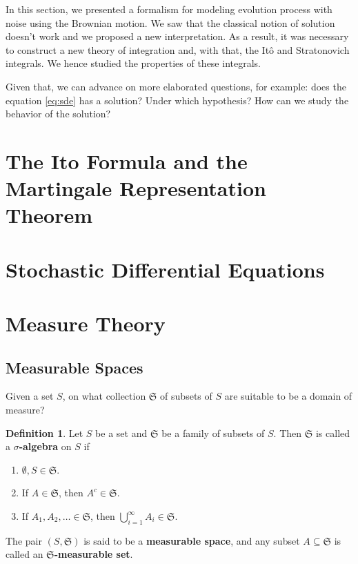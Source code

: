 \documentclass[12pt,a4paper]{article}
\theoremstyle{definition}
\newtheorem{definition}{Definition}[section]
\begin{document}
In this section, we presented a formalism for modeling evolution process with noise using the Brownian motion. We saw that the classical notion of solution doesn't work and we proposed a new interpretation. As a result, it was necessary to construct a new theory of integration and, with that, the Itô and Stratonovich integrals. We hence studied the properties of these integrals.

Given that, we can advance on more elaborated questions, for example: does the equation \eqref{eq:sde} has a solution? Under which hypothesis? How can we study the behavior of the solution?

\newpage
\section{The Ito Formula and the Martingale Representation Theorem} %


\newpage
\section{Stochastic Differential Equations}


\appendix

\newpage
\section{Measure Theory}

\subsection{Measurable Spaces}

Given a set $S$, on what collection $\mathfrak{S}$ of subsets of $S$ are suitable to be a domain of measure?

\begin{definition}
	Let $S$ be a set and $\mathfrak{S}$ be a family of subsets of $S$. Then $\mathfrak{S}$ is called a \textbf{$\sigma$-algebra} on $S$ if
	\begin{enumerate}
		\item $\emptyset, S \in \mathfrak{S}$.
		\item If $A \in \mathfrak{S}$, then $A^c \in \mathfrak{S}$.
		\item If $A_1, A_2, \ldots \in \mathfrak{S}$, then $\bigcup_{i=1}^\infty A_i \in \mathfrak{S}$.
	\end{enumerate}

	The pair $(S, \mathfrak{S})$ is said to be a \textbf{measurable space}, and any subset $A \subseteq \mathfrak{S}$ is called an \textbf{$\mathfrak{S}$-measurable set}.
\end{definition}
\end{document}

